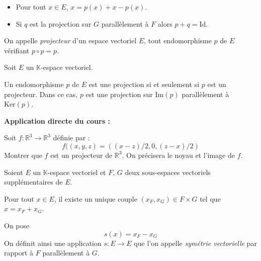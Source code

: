 \documentclass[french,11pt,twoside]{VcCours}
\newenvironment{ApplicationDirecte}{\textbf{Application directe du cours :}

}{}
\begin{document}
\begin{Demonstration}{}

\vspace{24cm}


\end{Demonstration}
\newpage

\begin{Remarques}{}
\begin{itemize} 
\item Pour tout $x \in E$, $x=p(x)+x-p(x)$. 
\item Si $q$ est la projection sur $G$ parallèlement à $F$ alors $p+q=\textrm{Id}$.
\end{itemize}
\end{Remarques}{}

\begin{Definition}{} On appelle \emph{projecteur} d'un espace vectoriel $E$, tout endomorphisme $p$ de $E$ vérifiant $p \circ p = p$.
\end{Definition}

\begin{Proposition}{} Soit $E$ un $\mathbb{K}$-espace vectoriel.

Un endomorphisme $p$ de $E$ est une projection si et seulement si $p$ est un projecteur. Dans ce cas, $p$ est une projection sur $\textrm{Im}(p)$ parallèlement à $\textrm{Ker}(p)$.
\end{Proposition}

\begin{Demonstration}{}
\vspace{12cm}

\end{Demonstration}
\newpage

\begin{ApplicationDirecte} Soit $f : \mathbb{R}^3 \rightarrow \mathbb{R}^3$ définie par :
$$ f((x,y,z)=((x-z)/2,0,(z-x)/2)$$
Montrer que $f$ est un projecteur de $\mathbb{R}^3$. On précisera le noyau et l'image de $f$.
\end{ApplicationDirecte}

\begin{Definition}{}
	Soient $E$ un $\mathbb{K}$-espace vectoriel 
	et $F$, $G$ deux sous-espaces vectoriels supplémentaires de $E$.

	Pour tout $x \in E$, il existe un unique couple $(x_F,x_G) \in F \times G$ 
	tel que $x=x_F+x_G$.
	
	On pose \[s(x)=x_F-x_G\]
	On définit ainsi une application $s : E \rightarrow E$ que l'on appelle 
	\emph{symétrie vectorielle} par rapport à $F$ parallèlement à $G$. 
\end{Definition}
\end{document}
